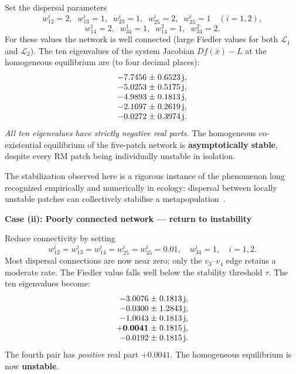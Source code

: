 \documentclass[12pt,a4paper]{article}
\theoremstyle{definition}
\begin{document}
Set the dispersal parameters
\begin{equation*}
  w^i_{12} = 2,\;\;
  w^i_{13} = 1,\;\;
  w^i_{23} = 1,\;\;
  w^i_{25} = 2,\;\;
  w^i_{35} = 1 \quad (i=1,2),
  \label{eq:ex2_disp1a}
\end{equation*}
\begin{equation*}
  w^1_{14} = 2,\;\; w^1_{34} = 1,\;\;
  w^2_{14} = 1,\;\; w^2_{34} = 2.
  \label{eq:ex2_disp1b}
\end{equation*}
For these values the network is well connected (large Fiedler values
for both $\mathcal{L}_1$ and $\mathcal{L}_2$).
The ten eigenvalues of the system Jacobian $Df(\bar{x}) - L$ at the
homogeneous equilibrium are (to four decimal places):
\begin{equation*}
  \begin{array}{r@{\;\pm\;}l}
    -7.7456 & 0.6523\,\mathrm{j}, \\
    -5.0253 & 0.5175\,\mathrm{j}, \\
    -4.9893 & 0.1813\,\mathrm{j}, \\
    -2.1697 & 0.2619\,\mathrm{j}, \\
    -0.0272 & 0.3974\,\mathrm{j}.
  \end{array}
  \label{eq:ex2_eig1}
\end{equation*}
\emph{All ten eigenvalues have strictly negative real parts.}
The homogeneous co-existential equilibrium of the five-patch network
is \textbf{asymptotically stable}, despite every RM patch being
individually unstable in isolation.

The stabilization observed here is a rigorous instance of the
phenomenon long recognized empirically and numerically in ecology:
dispersal between locally unstable patches can collectively stabilise
a metapopulation~\cite{briggs2004}.



\noindent
\textbf{Case (ii): Poorly connected network --- return to
instability}

Reduce connectivity by setting
\begin{equation*}
  w^i_{12} = w^i_{13} = w^i_{14} = w^i_{25} = w^i_{35} = 0.01,
  \quad
  w^i_{34} = 1,
  \quad i = 1,2.
  \label{eq:ex2_disp2}
\end{equation*}
Most dispersal connections are now near zero; only the $v_3$--$v_4$
edge retains a moderate rate.
The Fiedler value falls well below the stability threshold $\tau$.
The ten eigenvalues become:
\begin{equation*}
  \begin{array}{r@{\;\pm\;}l}
    -3.0076 & 0.1813\,\mathrm{j}, \\
    -0.0300 & 1.2843\,\mathrm{j}, \\
    -1.0043 & 0.1813\,\mathrm{j}, \\
    \mathbf{+0.0041} & 0.1815\,\mathrm{j}, \\
    -0.0192 & 0.1815\,\mathrm{j}.
  \end{array}
  \label{eq:ex2_eig2}
\end{equation*}
The fourth pair has \emph{positive} real part $+0.0041$.
The homogeneous equilibrium is now \textbf{unstable}.
\end{document}
